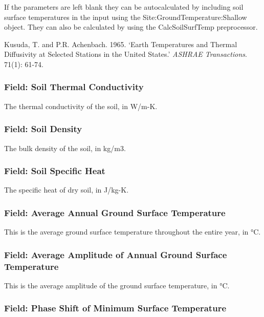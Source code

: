 If the parameters are left blank they can be autocalculated by including soil surface temperatures in the input using the Site:GroundTemperature:Shallow object. They can also be calculated by using the CalcSoilSurfTemp preprocessor.

Kusuda, T. and P.R. Achenbach. 1965. `Earth Temperatures and Thermal Diffusivity at Selected Stations in the United States.' \emph{ASHRAE Transactions}. 71(1): 61-74.

\subsubsection{Field: Soil Thermal Conductivity}\label{field-soil-thermal-conductivity-1}

The thermal conductivity of the soil, in W/m-K.

\subsubsection{Field: Soil Density}\label{field-soil-density-1}

The bulk density of the soil, in kg/m3.

\subsubsection{Field: Soil Specific Heat}\label{field-soil-specific-heat-1}

The specific heat of dry soil, in J/kg-K.

\subsubsection{Field: Average Annual Ground Surface Temperature}\label{field-average-annual-ground-surface-temperature}

This is the average ground surface temperature throughout the entire year, in °C.

\subsubsection{Field: Average Amplitude of Annual Ground Surface Temperature}\label{field-average-amplitude-of-annual-ground-surface-temperature}

This is the average amplitude of the ground surface temperature, in °C.

\subsubsection{Field: Phase Shift of Minimum Surface Temperature}\label{field-phase-shift-of-minimum-surface-temperature}

